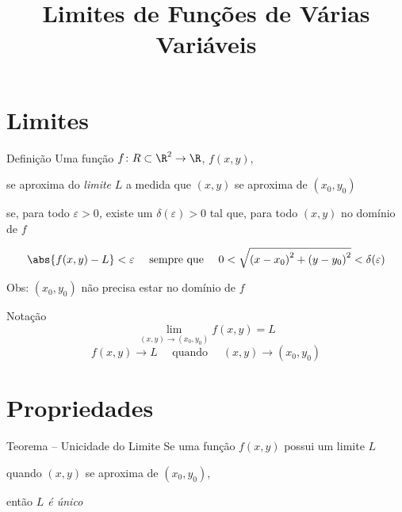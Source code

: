 
\usepackage{calculo_varias_variaveis-1}

\title {Limites de Funções de Várias Variáveis}



\addtitle

\section{Limites}

\begin{frame}{Definição}
  Uma função
  \(f\colon R \subset \R^2 \to \R\), \;
  \pause
  \(f(x, y)\),

  \pause
  se aproxima do \emph{limite} $L$
  a medida que \((x, y)\) se aproxima de \((x_0, y_0)\)

  \pause
  se, para todo \emph{$\varepsilon>0$,}
  \pause
  existe um \emph{\(\delta(\varepsilon)>0\)}
  \pause
  tal que,
  \pause
  para todo \((x, y)\) no domínio de $f$

  \pause
  \[
    \abs{f(x, y)-L} < \varepsilon
    \quad\text{ sempre que }\quad
    0 < \sqrt{ \left(x-x_0\right)^2 + \left(y-y_0\right)^2 } < \delta(\varepsilon)
  \]

  \pause
  Obs: \((x_0, y_0)\) não precisa estar no domínio de $f$
\end{frame}

\begin{frame}{Notação}
  \[
    \lim_{(x, y)\to(x_0, y_0)} f(x, y) = L
  \]
  \pause
  \vspace{\baselineskip}
  \[
    f(x, y) \to L \quad\text{ quando }\quad (x, y)\to(x_0, y_0)
  \]
\end{frame}

\section{Propriedades}

\begin{frame}{Teorema -- Unicidade do Limite}
  Se uma função \(f(x, y)\) possui um limite $L$

  quando \((x, y)\) se aproxima de \((x_0, y_0)\),

  \pause
  então \emph{$L$ é único}
\end{frame}

